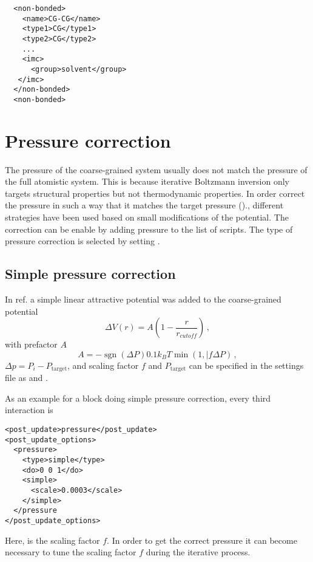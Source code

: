 \begin{lstlisting}
  <non-bonded>
    <name>CG-CG</name>
    <type1>CG</type1>
    <type2>CG</type2>
    ...
    <imc>
      <group>solvent</group>
   </imc>
  </non-bonded>
  <non-bonded>
\end{lstlisting}



\section{Pressure correction}

The pressure of the coarse-grained system usually does not match the pressure of the full atomistic system. This is because iterative Boltzmann inversion only targets structural properties but not thermodynamic properties. In order correct the pressure in such a way that it matches the target pressure ()., different strategies have been used based on small modifications of the potential. The correction can be enable by adding pressure to the list of  scripts. The type of pressure correction is selected by setting .

\subsection{Simple pressure correction}
In ref.\cite{Reith:2003} a simple linear attractive potential was added to the coarse-grained potential
\begin{equation}
  \Delta V(r)=A \left( 1-\frac{r}{r_{cutoff}} \right) \,,
\end{equation}
with prefactor $A$
\begin{equation}
  A = -\operatorname{sgn}(\Delta P)0.1k_{B}T\min(1,|f\Delta P) \,,
\end{equation}
$\Delta p=P_i-P_\text{target}$, and scaling factor $f$ and $P_\text{target}$ can be specified in the settings file as  and .

As an example for a block doing simple pressure correction, every third interaction is
\begin{lstlisting}
<post_update>pressure</post_update>
<post_update_options>
  <pressure>
    <type>simple</type>
    <do>0 0 1</do>
    <simple>
      <scale>0.0003</scale>
    </simple>
  </pressure
</post_update_options>
\end{lstlisting}
Here,  is the scaling factor $f$. In order to get the correct pressure it can become necessary to tune the scaling factor $f$ during the iterative process.

